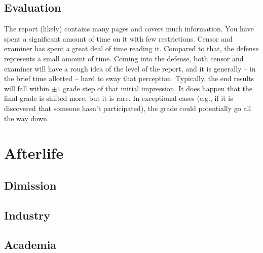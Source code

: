 \documentclass[a4paper, oneside]{memoir}
\begin{document}

\section{Evaluation}

The report (likely) contains many pages and covers much information. You have spent a significant amount of time on it with few restrictions. Censor and examiner has spent a great deal of time reading it. Compared to that, the defense represents a small amount of time. Coming into the defense, both censor and examiner will have a rough idea of the level of the report, and it is generally -- in the brief time allotted -- hard to sway that perception. Typically, the end results will fall within $\pm 1$ grade step of that initial impression. It does happen that the final grade is shifted more, but it is rare. In exceptional cases (e.g., if it is discovered that someone hasn't participated), the grade could potentially go all the way down.

\chapter{Afterlife}
\label{chap:afterlife}

\section{Dimission}


\section{Industry}



\section{Academia}



\end{document}
